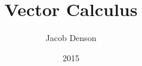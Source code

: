 

\title{Vector Calculus}
\author{Jacob Denson}
\date{2015}

\begin{comment}

\documentclass[12pt]{amsbook}


\usepackage{mathabx}
\usepackage{arydshln}

\usepackage[compact]{titlesec}
\titleformat{\chapter}[display]{}
    {\flushright\fontsize{14.4}{14.4}\selectfont{\MakeUppercase{\chaptertitlename}\hspace{2ex}}\fontsize{24.88}{24.88}\selectfont{\bf\thechapter}}{-20pt}{\huge\bfseries}
\titlespacing*{\chapter}{0pt}{0ex}{4ex}

\titleformat{\section}[block]
{\normalfont\sffamily}
{\thesection}{.5em}{\titlerule\\[.8ex]\bfseries}


\usepackage{enumitem}
\setlist[enumerate, 1]{leftmargin=20pt}
\setlist[itemize, 1]{leftmargin=10pt}


\usepackage{thmtools}
\makeatletter
\def\thm@space@setup{
  \thm@preskip=2mm
  \thm@postskip=0mm
}
\makeatother
\makeatother

\theoremstyle{plain}
\newtheorem{definition}{Definition}
\newtheorem{theorem}{Theorem}
\newtheorem{lemma}[theorem]{Lemma}
\newtheorem{corollary}[theorem]{Corollary}
\newtheorem{exercise}{Exercise}
\newtheorem{remark}{Remark}

\theoremstyle{definition}
\makeatletter  
\def\@endtheorem{\qed\endtrivlist\@endpefalse } %
\makeatother
\newtheorem*{proof}{Proof}


\usepackage{etoolbox}
\usepackage{needspace}
\AtBeginEnvironment{definition}{\Needspace{5\baselineskip}}



\end{comment}
